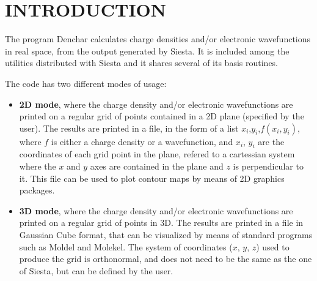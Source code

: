 
\tableofcontents

\newpage



\section{INTRODUCTION}

The program {\sc Denchar} calculates charge densities and/or electronic 
wavefunctions in real space, from the output generated by {\sc Siesta}.
It is included among the utilities distributed with {\sc Siesta}
and it shares several of its basis routines. 

The code has two different modes of usage:

\begin{itemize}

\item{\bf 2D mode}, where the charge density and/or electronic
wavefunctions are printed on a regular grid of points contained
in a 2D plane (specified by the user). 
The results are printed in a file, in the form
of a list $x_i$,$y_i$,$f(x_i,y_i)$, where $f$ is either a
charge density or a wavefunction, and $x_i$, $y_i$ are the coordinates
of each grid point in the plane, refered to a cartessian system
where the $x$ and $y$ axes are contained in the plane and $z$ is
perpendicular to it.
This file can be used to plot contour maps by means of
2D graphics packages.

\item{\bf 3D mode}, where the charge density and/or electronic
wavefunctions are printed on a regular grid of points in 3D.
The results are printed in a file in Gaussian Cube
format, that can be visualized by means of standard programs
such as {\sc Moldel} and {\sc Molekel}. The system of coordinates
($x$, $y$, $z$) used to produce the grid is orthonormal, and 
does not need to be the same as the one of {\sc Siesta}, but
can be defined by the user.

\end{itemize}

